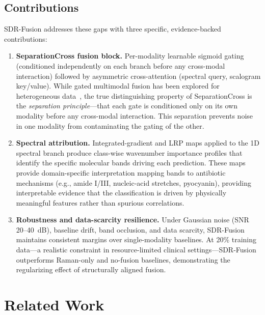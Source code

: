\documentclass[preprint,12pt]{elsarticle}
\begin{document}
\subsection{Contributions}
\label{ssec:contributions}

SDR-Fusion addresses these gaps with three specific, evidence-backed
contributions:

\begin{enumerate}

\item \textbf{SeparationCross fusion block.}
      Per-modality learnable sigmoid gating (conditioned
      independently on each branch before any cross-modal interaction)
      followed by asymmetric cross-attention (spectral query,
      scalogram key/value). While gated multimodal fusion has been
      explored for heterogeneous data~\cite{arevalo2017gated}, the
      true distinguishing property of SeparationCross is the
      \emph{separation principle}---that each gate is conditioned
      only on its own modality before any cross-modal interaction.
      This separation prevents noise in one modality from contaminating
      the gating of the other.

\item \textbf{Spectral attribution.}
      Integrated-gradient and LRP maps applied to the 1D spectral
      branch produce class-wise wavenumber importance profiles that
      identify the specific molecular bands driving each prediction.
      These maps provide domain-specific interpretation mapping bands
      to antibiotic mechanisms (e.g., amide I/III, nucleic-acid
      stretches, pyocyanin), providing interpretable evidence that the
      classification is driven by physically meaningful features
      rather than spurious correlations.

\item \textbf{Robustness and data-scarcity resilience.}
      Under Gaussian noise (SNR 20--40~dB), baseline drift, band
      occlusion, and data scarcity, SDR-Fusion maintains consistent
      margins over single-modality baselines. At 20\% training
      data---a realistic constraint in resource-limited clinical
      settings---SDR-Fusion outperforms Raman-only and no-fusion
      baselines, demonstrating the regularizing effect of structurally
      aligned fusion.

\end{enumerate}

\section{Related Work}
\label{sec:related}
\end{document}
